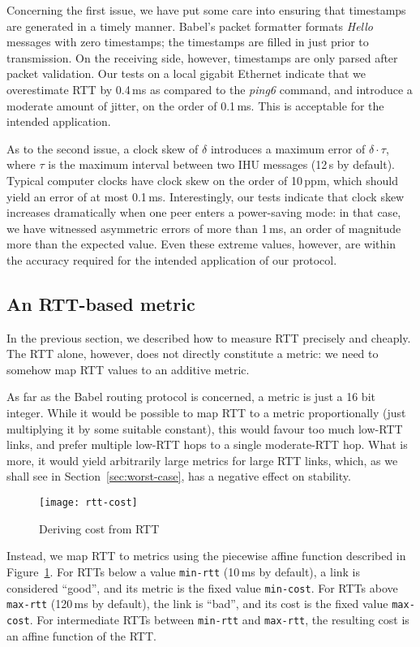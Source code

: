 \documentclass[conference,letterpaper]{IEEEtran}
\begin{document}
Concerning the first issue, we have put some care into ensuring that
timestamps are generated in a timely manner.  Babel's packet formatter
formats \emph{Hello} messages with zero timestamps; the timestamps are
filled in just prior to transmission.  On the receiving side, however,
timestamps are only parsed after packet validation.  Our tests on
a local gigabit Ethernet indicate that we overestimate RTT by 0.4\,ms
as compared to the \emph{ping6} command, and introduce a moderate
amount of jitter, on the order of 0.1\,ms.  This is acceptable for the
intended application.

As to the second issue, a clock skew of $\delta$ introduces a maximum
error of $\delta\cdot\tau$, where $\tau$ is the maximum interval
between two IHU messages (12\,s by default).  Typical computer clocks
have clock skew on the order of 10\,ppm, which should yield an error
of at most 0.1\,ms.  Interestingly, our tests indicate that clock skew
increases dramatically when one peer enters a power-saving mode: in
that case, we have witnessed asymmetric errors of more than 1\,ms, an
order of magnitude more than the expected value.  Even these extreme
values, however, are within the accuracy required for the intended
application of our protocol.

\subsection{An RTT-based metric}

In the previous section, we described how to measure RTT precisely and
cheaply.  The RTT alone, however, does not directly constitute
a metric: we need to somehow map RTT values to an additive metric.

As far as the Babel routing protocol is concerned, a metric is just
a 16 bit integer.  While it would be possible to map RTT to a metric
proportionally (just multiplying it by some suitable constant), this
would favour too much low-RTT links, and prefer multiple low-RTT hops
to a single moderate-RTT hop.  What is more, it would yield
arbitrarily large metrics for large RTT links, which, as we shall see
in Section~\ref{sec:worst-case}, has a negative effect on stability.

\begin{figure}[htb]
\centering
\texttt{[image: rtt-cost]}
\caption{Deriving cost from RTT}\label{fig:rtt-cost}
\end{figure}

Instead, we map RTT to metrics using the piecewise affine function
described in Figure~\ref{fig:rtt-cost}.  For RTTs below a value
\texttt{min-rtt} (10\,ms by default), a link is considered ``good'',
and its metric is the fixed value \texttt{min-cost}.  For RTTs above
\texttt{max-rtt} (120\,ms by default), the link is ``bad'', and its
cost is the fixed value \texttt{max-cost}.  For intermediate RTTs
between \texttt{min-rtt} and \texttt{max-rtt}, the resulting cost is
an affine function of the RTT.
\end{document}
